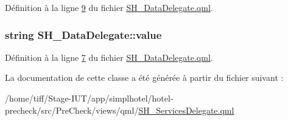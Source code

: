 Définition à la ligne \hyperlink{SH__DataDelegate_8qml_source_l00009}{9} du fichier \hyperlink{SH__DataDelegate_8qml_source}{S\-H\-\_\-\-Data\-Delegate.\-qml}.

\hypertarget{classSH__DataDelegate_acb9da3c73493c88865e08d9575f26482}{
\subsubsection[{value}]{\setlength{\rightskip}{0pt plus 5cm}string S\-H\-\_\-\-Data\-Delegate\-::value\hspace{0.3cm}{\ttfamily [inherited]}}}\label{classSH__DataDelegate_acb9da3c73493c88865e08d9575f26482}


Définition à la ligne \hyperlink{SH__DataDelegate_8qml_source_l00007}{7} du fichier \hyperlink{SH__DataDelegate_8qml_source}{S\-H\-\_\-\-Data\-Delegate.\-qml}.



La documentation de cette classe a été générée à partir du fichier suivant \-:\begin{DoxyCompactItemize}
\item 
/home/tiff/\-Stage-\/\-I\-U\-T/app/simplhotel/hotel-\/precheck/src/\-Pre\-Check/views/qml/\hyperlink{SH__ServicesDelegate_8qml}{S\-H\-\_\-\-Services\-Delegate.\-qml}\end{DoxyCompactItemize}
